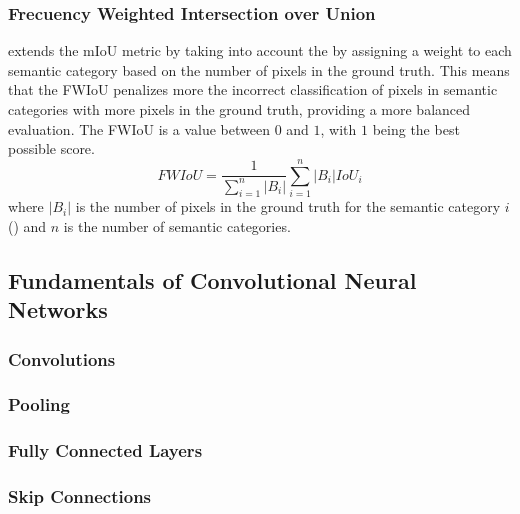     \subsubsection{Frecuency Weighted Intersection over Union}

       extends the mIoU metric
      by taking into account the  by assigning a weight
      to each semantic category based on the number of pixels in the ground truth. This
      means that the FWIoU penalizes more the incorrect classification of pixels in
      semantic categories with more pixels in the ground truth, providing a more balanced
      evaluation\cite{lin2017refinenet,long2015fully}. The FWIoU is a value between $0$
      and $1$, with $1$ being the best possible score.
      \begin{equation}
        \label{eq:fwiou}
        FWIoU = \frac{1}{\sum_{i=1}^{n} |B_i|} \sum_{i=1}^{n} |B_i| IoU_i
      \end{equation}
      where $|B_i|$ is the number of pixels in the ground truth for the semantic
      category $i$ () and $n$ is the number of semantic categories.

  \subsection{Fundamentals of Convolutional Neural Networks}

    \Blindtext[1]

    \subsubsection{Convolutions}

      \Blindtext[1]

    \subsubsection{Pooling}

      \Blindtext[1]

    \subsubsection{Fully Connected Layers}

      \Blindtext[1]

    \subsubsection{Skip Connections}

